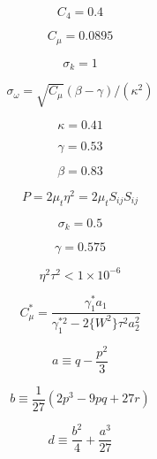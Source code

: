 \begin{equation}
C_4 = 0.4
\end{equation}

\begin{equation}
C_{\mu} = 0.0895
\end{equation}

\begin{equation}
\sigma_k = 1
\end{equation}

\begin{equation}
\sigma_{\omega} = \sqrt{C_{\mu}}(\beta - \gamma)/(\kappa^2)
\end{equation}

\begin{equation}
\kappa = 0.41
\end{equation}

\begin{equation}
\gamma = 0.53
\end{equation}

\begin{equation}
\beta = 0.83
\end{equation}

\begin{equation}
P = 2 \mu_t \eta^2 = 2 \mu_t S_{ij} S_{ij}
\end{equation}

\begin{equation}
\sigma_k = 0.5
\end{equation}

\begin{equation}
\gamma = 0.575
\end{equation}

\begin{equation}
\eta^2 \tau^2 < 1 \times 10^{-6}
\end{equation}

\begin{equation}
C_{\mu}^* = \frac{\gamma_1^* a_1}{\gamma_1^{*2} - 2 \lbrace W^2 \rbrace \tau^2 a_2^2}
\end{equation}

\begin{equation}
a \equiv q - \frac{p^2}{3}
\end{equation}

\begin{equation}
b \equiv \frac{1}{27} \left( 2 p^3 - 9 p q + 27 r \right)
\end{equation}

\begin{equation}
d \equiv \frac{b^2}{4} + \frac{a^3}{27}
\end{equation}

